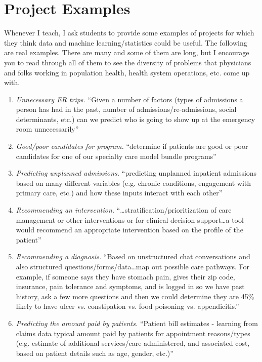 
\section{Project Examples \label{section:projectexamples}}

Whenever I teach, I ask students to provide some examples of projects for which they think data and machine learning/statistics could be useful. The following are real examples. There are many and some of them are long, but I encourage you to read through all of them to see the diversity of problems that physicians and folks working in population health, health system operations, etc. come up with.

\begin{enumerate}
\item \textit{Unnecessary ER trips.} ``Given a number of factors (types of admissions a person has had in the past, number of admissions/re-admissions, social determinants, etc.) can we predict who is going to show up at the emergency room unnecessarily''
\item \textit{Good/poor candidates for program.} ``determine if patients are good or poor candidates for one of our specialty care model bundle programs''
\item \textit{Predicting unplanned admissions.} ``predicting unplanned inpatient admissions based on many different variables (e.g. chronic conditions, engagement with primary care, etc.) and how these inputs interact with each other''
\item \textit{Recommending an intervention.} ``\dots stratification/prioritization of care management or other interventions or for clinical decision support\dots a tool would recommend an appropriate intervention based on the profile of the patient''
\item \textit{Recommending a diagnosis.} ``Based on unstructured chat conversations and also structured questions/forms/data\dots map out possible care pathways. For example, if someone says they have stomach pain, gives their zip code, insurance, pain tolerance and symptoms, and is logged in so we have past history, ask a few more questions and then we could determine they are 45\% likely to have ulcer vs. constipation vs. food poisoning vs. appendicitis.''
\item \textit{Predicting the amount paid by patients.} ``Patient bill estimates - learning from claims data typical amount paid by patients for appointment reasons/types (e.g. estimate of additional services/care administered, and associated cost, based on patient details such as age, gender, etc.)''

\end{enumerate}
